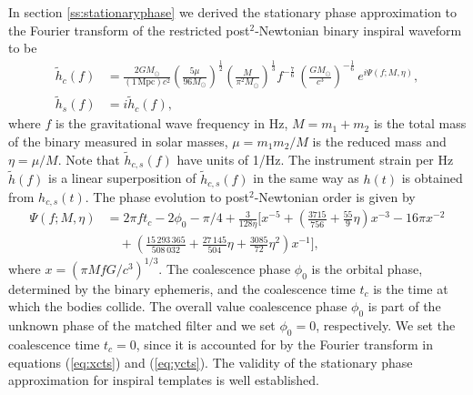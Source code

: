 In section \ref{ss:stationaryphase} we derived the stationary phase
approximation to the Fourier transform of the restricted post$^2$-Newtonian
binary inspiral waveform to be
\begin{align}
\label{eq:spcos}
\tilde{h}_c(f)&=\frac{2GM_\odot}{(1\,\mathrm{Mpc})c^2}
\left(\frac{5\mu}{96M_\odot}\right)^\frac{1}{2}
\left(\frac{M}{\pi^2M_\odot}\right)^\frac{1}{3}
f^{-\frac{7}{6}}\, \left( \frac{GM_\odot}{c^3} \right)^{-\frac{1}{6}}\,
e^{i\Psi(f;M,\eta)},\\
\tilde{h}_s(f)&=i\tilde{h}_c(f),
\label{eq:hsorthog}
\end{align}
where $f$ is the gravitational wave frequency in Hz, $M = m_1+m_2$ 
is the total mass of the binary measured in solar masses, $\mu = m_1 m_2 / M$
is the reduced mass and $\eta = \mu/M$.  Note that $\tilde{h}_{c,s}(f)$ have
units of 1/Hz.  The instrument strain per Hz $\tilde{h}(f)$ is 
a linear superposition of $\tilde{h}_{c,s}(f)$ in the same way as
$h(t)$ is obtained from $h_{c,s}(t)$. The phase evolution to
post$^2$-Newtonian order is given by
\begin{equation}
\begin{split}
\Psi(f;M,\eta) &= 2\pi ft_c-2\phi_0-\pi/4+\frac{3}{128\eta}\biggl[x^{-5}+
\left(\frac{3715}{756}+\frac{55}{9}\eta\right)x^{-3}
-16\pi x^{-2} \\
&\quad +\left(\frac{15\,293\,365}{508\,032}+\frac{27\,145}{504}\eta
+\frac{3085}{72}\eta^2\right)x^{-1}\biggr],
\label{eq:spphase}
\end{split}
\end{equation}
where $x=(\pi M f G/c^3)^{1/3}$. The coalescence phase $\phi_0$ is the orbital
phase, determined by the binary ephemeris, and the coalescence time $t_c$ is
the time at which the bodies collide. The overall value coalescence phase
$\phi_0$ is part of the unknown phase of the matched filter and we set
$\phi_0=0$, respectively.  We set the coalescence time $t_c = 0$, since it is
accounted for by the Fourier transform in equations (\ref{eq:xcts}) and
(\ref{eq:ycts}).  The validity of the stationary phase approximation for
inspiral templates is well established\cite{Droz:1999qx}.

